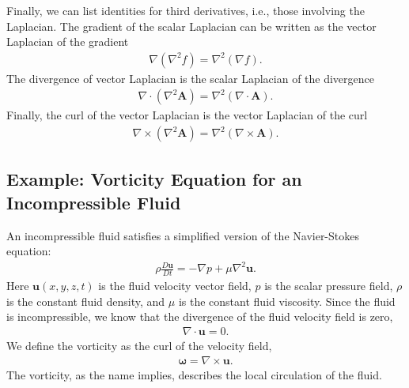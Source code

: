 Finally, we can list identities for third derivatives, i.e., those involving the Laplacian. The gradient of the scalar Laplacian can be written as the vector Laplacian of the gradient
\begin{align}
  \nabla ( \nabla^2 f ) = \nabla^2 ( \nabla f ).
\end{align}
The divergence of vector Laplacian is the scalar Laplacian of the divergence
\begin{align}
  \nabla \cdot ( \nabla^2 \mathbf{A} ) = \nabla^2 ( \nabla \cdot \mathbf{A} ).
\end{align}
Finally, the curl of the vector Laplacian is the vector Laplacian of the curl
\begin{align}
  \nabla \times ( \nabla^2 \mathbf{A} ) = \nabla^2 ( \nabla \times \mathbf{A} ).
\end{align}

\subsection{Example: Vorticity Equation for an Incompressible Fluid}

An incompressible fluid satisfies a simplified version of the Navier-Stokes equation:
\begin{align}
  \rho \frac{D\mathbf{u}}{Dt} = -\nabla p + \mu \nabla^2 \mathbf{u}.
\end{align}
Here $\mathbf{u}(x,y,z,t)$ is the fluid velocity vector field, $p$ is the scalar pressure field, $\rho$ is the constant fluid density, and $\mu$ is the constant fluid viscosity. Since the fluid is incompressible, we know that the divergence of the fluid velocity field is zero,
\begin{align}
  \nabla \cdot \mathbf{u} = 0.
\end{align}
We define the vorticity as the curl of the velocity field,
\begin{align}
  \boldsymbol\omega = \nabla \times \mathbf{u}.
\end{align}
The vorticity, as the name implies, describes the local circulation of the fluid. 

